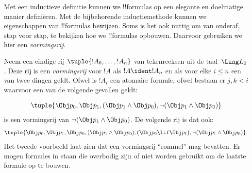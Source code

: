 \documentclass[openany]{memoir}
\begin{document}
\begingroup
\def\olfilename{OLP-0060}
\def\olfilepath{content/propositional-logic/syntax-and-semantics/}
\hypertarget{unit-OLP-0060}{}





Met een inductieve definitie kunnen we !!{formula}s op een elegante en
doelmatige manier definiëren. Met de bijbehorende inductiemethode
kunnen we eigenschappen van !!{formula}s bewijzen. Soms is het ook
nuttig om van onderaf, stap voor stap, te bekijken hoe we !!{formula}s
opbouwen. Daarvoor gebruiken we hier een \emph{vormingsrij}.

\begin{defn}
Neem een eindige rij $\tuple{!A_0,\dotsc,!A_n}$ van tekenreeksen uit de
taal~$\Lang L_0$. Deze rij is een \emph{vormingsrij} voor $!A$ als
$!A \ident !A_n$ en als voor elke $i \leq n$ een van twee dingen
geldt. Ofwel is $!A_i$ een atomaire formule, ofwel bestaan er
$j,k < i$ waarvoor een van de volgende gevallen geldt:
\begin{enumerate}
\end{enumerate}
\end{defn}

\begin{ex}
\[
\tuple{
    \Obj p_0,
    \Obj p_1,
    (\Obj p_1 \land \Obj p_0),
    \lnot (\Obj p_1 \land \Obj p_0)
}
\]
is een vormingsrij van
$\lnot (\Obj p_1 \land \Obj p_0)$. De volgende rij is dat ook:
\[
\tuple{
    \Obj p_0,
    \Obj p_1,
    \Obj p_0,
    (\Obj p_1 \land \Obj p_0),
    (\Obj p_0 \lif \Obj p_1),
    \lnot (\Obj p_1 \land \Obj p_0)
}.
\]
%
Het tweede voorbeeld laat zien dat een vormingsrij ``rommel'' mag
bevatten. Er mogen formules in staan die overbodig zijn of niet worden
gebruikt om de laatste formule op te bouwen.
\end{ex}
\end{document}

